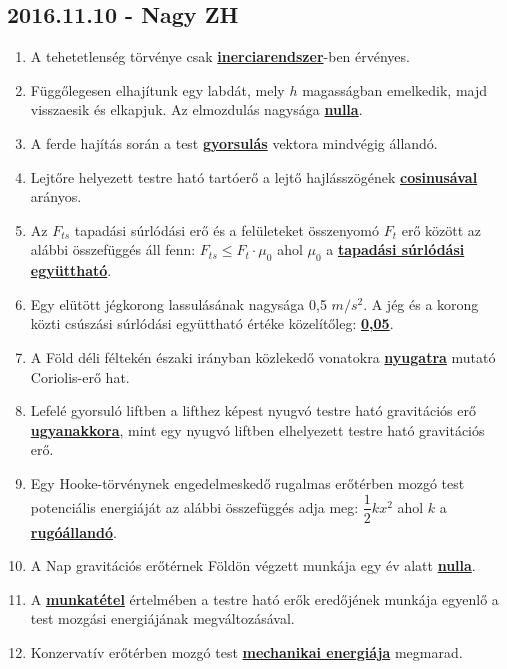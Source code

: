 \documentclass[../../fizika_kerdesek.tex]{subfiles}
\begin{document}
    \subsection{2016.11.10 - Nagy ZH}

        \begin{enumerate}
            \item A tehetetlenség törvénye csak \underline{\textbf{inerciarendszer}}-ben érvényes.
            \item Függőlegesen elhajítunk egy labdát, mely $h$ magasságban emelkedik, majd visszaesik és elkapjuk. Az elmozdulás nagysága \underline{\textbf{nulla}}.
            \item A ferde hajítás során a test \underline{\textbf{gyorsulás}} vektora  mindvégig állandó.
            \item Lejtőre helyezett testre ható tartóerő a lejtő hajlásszögének \underline{\textbf{cosinusával}} arányos.
            \item Az $F_{ts}$ tapadási súrlódási erő és a felületeket összenyomó $F_t$ erő között az alábbi összefüggés áll fenn: \underline{\textbf{$F_{ts} \le F_t \cdot \mu_0$}} ahol $\mu_0$ a \underline{\textbf{tapadási súrlódási együttható}}.
            \item Egy elütött jégkorong lassulásának nagysága 0,5 $m/s^2$. A jég és a korong közti csúszási súrlódási együttható értéke közelítőleg: \underline{\textbf{0,05}}.
            \item A Föld déli féltekén északi irányban közlekedő vonatokra \underline{\textbf{nyugatra}} mutató Coriolis-erő hat.
            \item Lefelé gyorsuló liftben a lifthez képest nyugvó testre ható gravitációs erő \underline{\textbf{ugyanakkora}}, mint egy nyugvó liftben elhelyezett testre ható gravitációs erő.
            \item Egy Hooke-törvénynek engedelmeskedő rugalmas erőtérben mozgó test potenciális energiáját az alábbi összefüggés adja meg: \underline{\textbf{$\dfrac{1}{2}kx^2$}} ahol $k$ a \underline{\textbf{rugóállandó}}.
            \item A Nap gravitációs erőtérnek Földön végzett munkája egy év alatt \underline{\textbf{nulla}}.
            \item A \underline{\textbf{munkatétel}} értelmében a testre ható erők eredőjének munkája egyenlő a test mozgási energiájának megváltozásával.
            \item Konzervatív erőtérben mozgó test \underline{\textbf{mechanikai energiája}} megmarad.
        \end{enumerate}

    \underline{\textbf{}}
\end{document}
